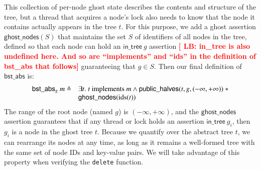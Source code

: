 \documentclass[runningheads]{llncs}
\newcommand{\LB}[1]{\textbf{\textcolor{red}{[ LB: #1]}}}
\newcommand{\treerep}{\ensuremath{\mathsf{bst\_abs}}}
\begin{document}
This collection of per-node ghost state describes the contents and structure of the tree, but a thread that acquires a node's lock also needs to know that the node it contains actually appears in the tree $t$. For this purpose, we add a ghost assertion $\mathsf{ghost\_nodes}(S)$ that maintains the set $S$ of identifiers of all nodes in the tree, defined so that each node can hold an $\mathsf{in\_tree}\ g$ assertion \LB{in\_tree is also undefined here. And so are ``implements'' and ``ids'' in the definition of bst\_abs that follows} guaranteeing that $g \in S$. Then our final definition of $\treerep$ is:
$$\begin{array}{r l}\treerep_g\ m \triangleq &\exists t.\ t \textrm{ implements } m \land \mathsf{public\_halves}(t, g, (-\infty, +\infty))\ * \\&\mathsf{ghost\_nodes}(\mathrm{ids}(t))\end{array}$$
The range of the root node (named $g$) is $(-\infty, +\infty)$, and the $\mathsf{ghost\_nodes}$ assertion guarantees that if any thread or lock holds an assertion $\mathsf{in\_tree}\ g_i$, then $g_i$ is a node in the ghost tree $t$. Because we quantify over the abstract tree $t$, we can rearrange its nodes at any time, as long as it remains a well-formed tree with the same set of node IDs and key-value pairs. We will take advantage of this property when verifying the \lstinline{delete} function.
\end{document}
